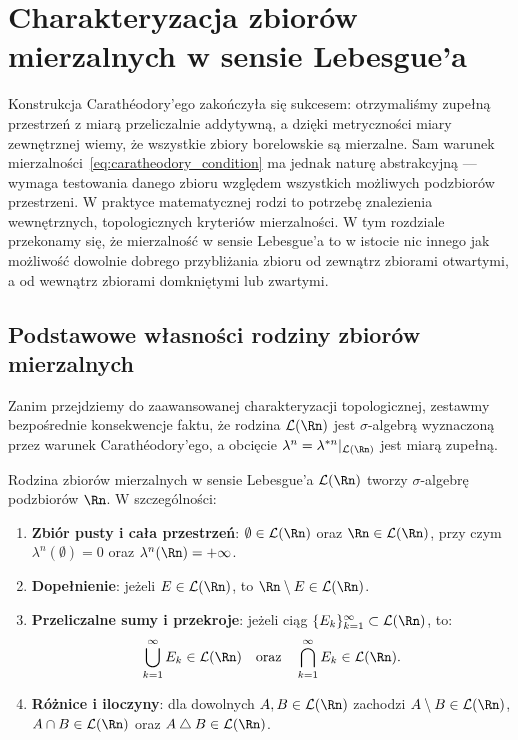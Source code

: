 \section{Charakteryzacja zbiorów mierzalnych w sensie Lebesgue'a}

Konstrukcja Carathéodory'ego zakończyła się sukcesem: otrzymaliśmy zupełną przestrzeń z miarą przeliczalnie addytywną, a dzięki metryczności miary zewnętrznej wiemy, że wszystkie zbiory borelowskie są mierzalne. Sam warunek mierzalności~\eqref{eq:caratheodory_condition} ma jednak naturę abstrakcyjną — wymaga testowania danego zbioru względem wszystkich możliwych podzbiorów przestrzeni. W praktyce matematycznej rodzi to potrzebę znalezienia wewnętrznych, topologicznych kryteriów mierzalności. W tym rozdziale przekonamy się, że mierzalność w sensie Lebesgue'a to w istocie nic innego jak możliwość dowolnie dobrego przybliżania zbioru od zewnątrz zbiorami otwartymi, a od wewnątrz zbiorami domkniętymi lub zwartymi.

\subsection{Podstawowe własności rodziny zbiorów mierzalnych}
Zanim przejdziemy do zaawansowanej charakteryzacji topologicznej, zestawmy bezpośrednie konsekwencje faktu, że rodzina $\mathcal{L}(\Rn)$ jest $\sigma$-algebrą wyznaczoną przez warunek Carathéodory'ego, a obcięcie $\lambda^n = \lambda^{*n}|_{\mathcal{L}(\Rn)}$ jest miarą zupełną.
\begin{tw} Rodzina zbiorów mierzalnych w sensie Lebesgue'a $\mathcal{L}(\Rn)$ tworzy $\sigma$-algebrę podzbiorów $\Rn$. W szczególności:
    \begin{enumerate}
        \item \textbf{Zbiór pusty i cała przestrzeń}: $\emptyset \in \mathcal{L}(\Rn)$ oraz $\Rn \in \mathcal{L}(\Rn)$, przy czym $\lambda^n(\emptyset) = 0$ oraz $\lambda^n(\Rn) = +\infty$.

        \item \textbf{Dopełnienie}: jeżeli $E \in \mathcal{L}(\Rn)$, to $\Rn \setminus E \in \mathcal{L}(\Rn)$.

        \item \textbf{Przeliczalne sumy i przekroje}: jeżeli ciąg $\{E_k\}_{k=1}^\infty \subset \mathcal{L}(\Rn)$, to:
              \begin{equation*}
                  \bigcup_{k=1}^\infty E_k \in \mathcal{L}(\Rn) \quad \text{oraz} \quad \bigcap_{k=1}^\infty E_k \in \mathcal{L}(\Rn).
              \end{equation*}

        \item \textbf{Różnice i iloczyny}: dla dowolnych $A, B \in \mathcal{L}(\Rn)$ zachodzi $A \setminus B \in \mathcal{L}(\Rn)$, $A \cap B \in \mathcal{L}(\Rn)$ oraz $A \mathbin{\triangle} B \in \mathcal{L}(\Rn)$.

    \end{enumerate}
\end{tw}

